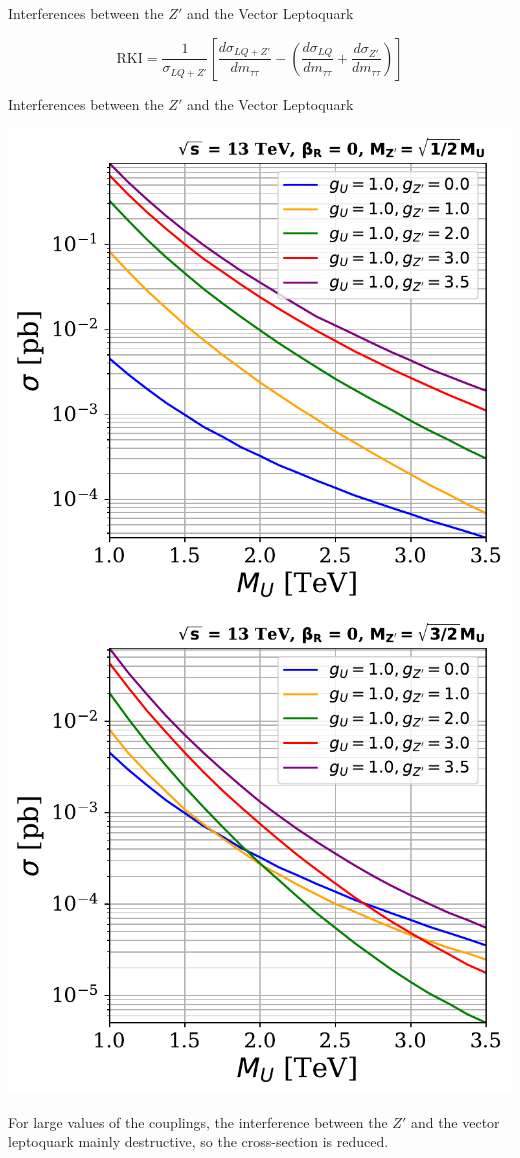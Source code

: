 \documentclass{bredelebeamer}
\begin{document}
\begin{frame}{Interferences between the $Z'$ and the Vector Leptoquark}
\begin{minipage}{.48\linewidth}
		\begin{equation*}
			\mathrm{RKI}=\frac{1}{\sigma_{ LQ+Z'}}\left[\frac{d\sigma_{ LQ+Z'}}{dm_{\tau\tau}}-\left(\frac{d\sigma_{ LQ}}{dm_{\tau\tau}}+\frac{d\sigma_{Z'}}{dm_{\tau\tau}}\right)\right]
		\end{equation*}
	\end{minipage}	
\end{frame}

\begin{frame}{Interferences between the $Z'$ and the Vector Leptoquark}
	\begin{center}
		\includegraphics[width=.48\linewidth]{XS_gu_gzp_lower_limit_woRHC.pdf}
		\includegraphics[width=.48\linewidth]{XS_gu_gzp_upper_limit_woRHC.pdf}
	\end{center}
	{\large 
		For large values of the couplings, the interference between the $Z'$ and the vector leptoquark mainly destructive, so the cross-section is reduced.
	}
\end{frame}
\end{document}
